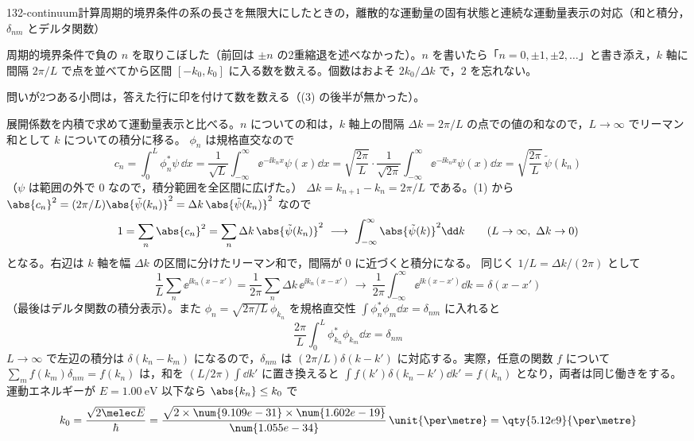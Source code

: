 \documentclass[uplatex,dvipdfmx,a4paper,11pt]{jsarticle}
\begin{document}
\begin{mondai}{132-continuum}{計算}{周期的境界条件の系の長さを無限大にしたときの，離散的な運動量の固有状態と連続な運動量表示の対応（和と積分，$\delta_{nm}$ とデルタ関数）}
\begin{kizuki}
\item {} 周期的境界条件で負の $n$ を取りこぼした（前回は $\pm n$ の2重縮退を述べなかった）。$n$ を書いたら「$n=0,\pm1,\pm2,\ldots$」と書き添え，$k$ 軸に間隔 $2\pi/L$ で点を並べてから区間 $[-k_{0},k_{0}]$ に入る数を数える。個数はおよそ $2k_{0}/\Delta k$ で，$2$ を忘れない。
\item 問いが2つある小問は，答えた行に印を付けて数を数える（(3) の後半が無かった）。
\end{kizuki}
\begin{tadashii}
\houshin 展開係数を内積で求めて運動量表示と比べる。$n$ についての和は，$k$ 軸上の間隔 $\Delta k=2\pi/L$ の点での値の和なので，$L\to\infty$ でリーマン和として $k$ についての積分に移る。
\keisan
{} $\phi_{n}$ は規格直交なので
\[ c_{n}=\int_{0}^{L}\phi_{n}^{*}\psi\,\dd x=\frac{1}{\sqrt{L}}\int_{-\infty}^{\infty}\ee^{-\ii k_{n}x}\psi(x)\dd x=\sqrt{\frac{2\pi}{L}}\cdot\frac{1}{\sqrt{2\pi}}\int_{-\infty}^{\infty}\ee^{-\ii k_{n}x}\psi(x)\dd x=\sqrt{\frac{2\pi}{L}}\,\tilde{\psi}(k_{n}) \]
（$\psi$ は範囲の外で $0$ なので，積分範囲を全区間に広げた。）
 $\Delta k=k_{n+1}-k_{n}=2\pi/L$ である。(1) から $\abs{c_{n}}^{2}=(2\pi/L)\abs{\tilde{\psi}(k_{n})}^{2}=\Delta k\,\abs{\tilde{\psi}(k_{n})}^{2}$ なので
\[ 1=\sum_{n}\abs{c_{n}}^{2}=\sum_{n}\Delta k\,\abs{\tilde{\psi}(k_{n})}^{2}\ \longrightarrow\ \int_{-\infty}^{\infty}\abs{\tilde{\psi}(k)}^{2}\dd k\qquad(L\to\infty,\ \Delta k\to0) \]
となる。右辺は $k$ 軸を幅 $\Delta k$ の区間に分けたリーマン和で，間隔が $0$ に近づくと積分になる。
 同じく $1/L=\Delta k/(2\pi)$ として
\[ \frac{1}{L}\sum_{n}\ee^{\ii k_{n}(x-x')}=\frac{1}{2\pi}\sum_{n}\Delta k\,\ee^{\ii k_{n}(x-x')}\ \longrightarrow\ \frac{1}{2\pi}\int_{-\infty}^{\infty}\ee^{\ii k(x-x')}\dd k=\delta(x-x') \]
（最後はデルタ関数の積分表示）。また $\phi_{n}=\sqrt{2\pi/L}\,\phi_{k_{n}}$ を規格直交性 $\int\phi_{n}^{*}\phi_{m}\dd x=\delta_{nm}$ に入れると
\[ \frac{2\pi}{L}\int_{0}^{L}\phi_{k_{n}}^{*}\phi_{k_{m}}\dd x=\delta_{nm} \]
$L\to\infty$ で左辺の積分は $\delta(k_{n}-k_{m})$ になるので，$\delta_{nm}$ は $(2\pi/L)\delta(k-k')$ に対応する。実際，任意の関数 $f$ について $\sum_{m}f(k_{m})\delta_{nm}=f(k_{n})$ は，和を $(L/2\pi)\int\dd k'$ に置き換えると $\int f(k')\delta(k_{n}-k')\dd k'=f(k_{n})$ となり，両者は同じ働きをする。
 運動エネルギーが $E=\qty{1.00}{\electronvolt}$ 以下なら $\abs{k_{n}}\le k_{0}$ で
\[ k_{0}=\frac{\sqrt{2\melec E}}{\hbar}=\frac{\sqrt{2\times\num{9.109e-31}\times\num{1.602e-19}}}{\num{1.055e-34}}\,\unit{\per\metre}=\qty{5.12e9}{\per\metre} \]

\end{tadashii}
\end{mondai}
\end{document}
